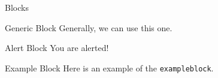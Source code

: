 \documentclass[14pt]{beamer}
\begin{document}
\begin{frame}[fragile]{Blocks}
  \begin{block}{Generic Block}
    Generally, we can use this one.
  \end{block}

  \begin{alertblock}{Alert Block}
    You are alerted!
  \end{alertblock}

  \begin{exampleblock}{Example Block}
    Here is an example of the \verb|exampleblock|.
  \end{exampleblock}
\end{frame}
\end{document}
